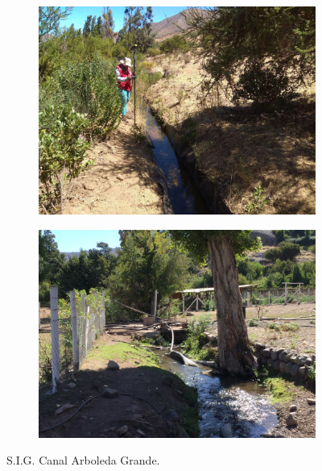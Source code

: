 \documentclass[]{article}
\begin{document}
\begin{figure}[H]
  \centering
\begin{subfigure}{.45\textwidth}
\hfill
  \includegraphics[width=\textwidth]{Foto/a1.jpg}
\end{subfigure}
\hfill
\begin{subfigure}{.45\textwidth}
\hfill
  \includegraphics[angle= 180, width=\textwidth]{Foto/a2.jpg} 
\end{subfigure}
\caption{S.I.G. Canal Arboleda Grande.}
\end{figure}
\end{document}
